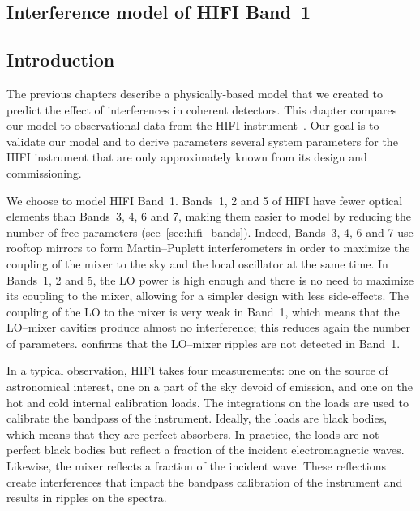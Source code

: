 \cleardoublepage
\begin{refsection}
\chapter{Interference model of HIFI Band~1}
\label{sec:chapter4}


\section{Introduction}
The previous chapters describe a physically-based model that we created to predict the effect of interferences in coherent detectors.
This chapter compares our model to observational data from the HIFI instrument~\parencite{AA_518_L6}.
Our goal is to validate our model and to derive parameters several system parameters for the HIFI instrument that are only approximately known from its design and commissioning.

We choose to model HIFI Band~1.
Bands~1, 2 and 5 of HIFI have fewer optical elements than Bands~3, 4, 6 and 7, making them easier to model by reducing the number of free parameters (see~\cref{sec:hifi_bands}).
Indeed, Bands~3, 4, 6 and 7 use rooftop mirrors to form Martin--Puplett interferometers in order to maximize the coupling of the mixer to the sky and the local oscillator at the same time.
In Bands~1, 2 and 5, the LO power is high enough and there is no need to maximize its coupling to the mixer, allowing for a simpler design with less side-effects.
The coupling of the LO to the mixer is very weak in Band~1, which means that the LO--mixer cavities produce almost no interference;
this reduces again the number of parameters.
\Textcite{risacher2011standingwaves} confirms that the LO--mixer ripples are not detected in Band~1.

In a typical observation, HIFI takes four measurements: one on the source of astronomical interest, one on a part of the sky devoid of emission, and one on the hot and cold internal calibration loads.
The integrations on the loads are used to calibrate the bandpass of the instrument.
Ideally, the loads are black bodies, which means that they are perfect absorbers.
In practice, the loads are not perfect black bodies but reflect a fraction of the incident electromagnetic waves.
Likewise, the mixer reflects a fraction of the incident wave.
These reflections create interferences that impact the bandpass calibration of the instrument and results in ripples on the spectra.





\end{refsection}
